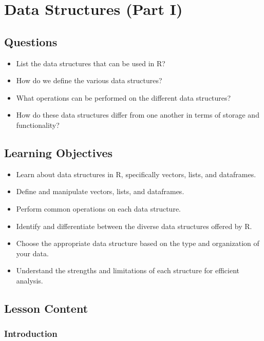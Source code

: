 \documentclass[
  letterpaper,
  DIV=11,
  numbers=noendperiod]{scrreprt}
\begin{document}

\chapter{Data Structures (Part I)}\label{sec-data-structure-1}

\section{Questions}\label{questions-9}

\begin{itemize}
\item
  List the data structures that can be used in R?
\item
  How do we define the various data structures?
\item
  What operations can be performed on the different data structures?
\item
  How do these data structures differ from one another in terms of
  storage and functionality?
\end{itemize}

\section{Learning Objectives}\label{learning-objectives-9}

\begin{itemize}
\item
  Learn about data structures in R, specifically vectors, lists, and
  dataframes.
\item
  Define and manipulate vectors, lists, and dataframes.
\item
  Perform common operations on each data structure.
\item
  Identify and differentiate between the diverse data structures offered
  by R.
\item
  Choose the appropriate data structure based on the type and
  organization of your data.
\item
  Understand the strengths and limitations of each structure for
  efficient analysis.
\end{itemize}

\section{Lesson Content}\label{lesson-content-9}

\subsection{Introduction}\label{introduction-7}
\end{document}
